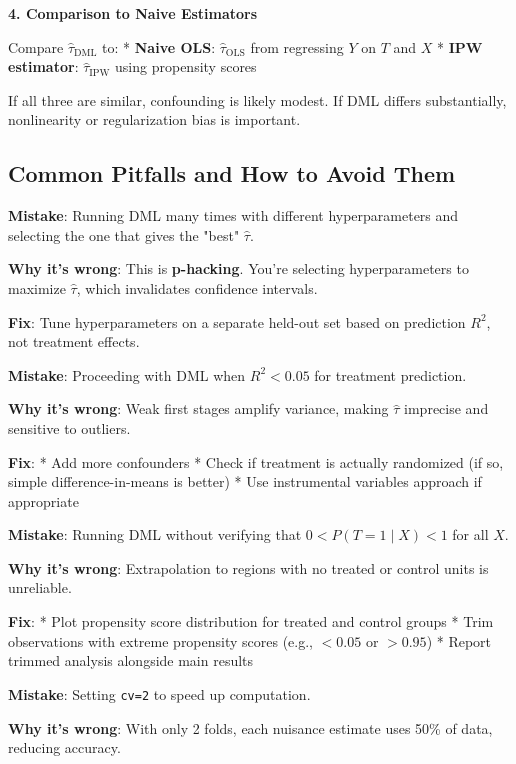 \textbf{4. Comparison to Naive Estimators}

Compare \(\hat{\tau}_{\text{DML}}\) to: * \textbf{Naive OLS}:
\(\hat{\tau}_{\text{OLS}}\) from regressing \(Y\) on \(T\) and \(X\) *
\textbf{IPW estimator}: \(\hat{\tau}_{\text{IPW}}\) using propensity
scores

If all three are similar, confounding is likely modest. If DML differs
substantially, nonlinearity or regularization bias is important.

\subsection{Common Pitfalls and How to Avoid
Them}\label{_common_pitfalls_and_how_to_avoid_them}

\textbf{Mistake}: Running DML many times with different hyperparameters
and selecting the one that gives the "best" \(\hat{\tau}\).

\textbf{Why it's wrong}: This is \textbf{p-hacking}. You're selecting
hyperparameters to maximize \(\hat{\tau}\), which invalidates confidence
intervals.

\textbf{Fix}: Tune hyperparameters on a separate held-out set based on
prediction \(R^2\), not treatment effects.

\textbf{Mistake}: Proceeding with DML when \(R^2 < 0.05\) for treatment
prediction.

\textbf{Why it's wrong}: Weak first stages amplify variance, making
\(\hat{\tau}\) imprecise and sensitive to outliers.

\textbf{Fix}: * Add more confounders * Check if treatment is actually
randomized (if so, simple difference-in-means is better) * Use
instrumental variables approach if appropriate

\textbf{Mistake}: Running DML without verifying that
\(0 < P(T=1 \mid X) < 1\) for all \(X\).

\textbf{Why it's wrong}: Extrapolation to regions with no treated or
control units is unreliable.

\textbf{Fix}: * Plot propensity score distribution for treated and
control groups * Trim observations with extreme propensity scores (e.g.,
\(< 0.05\) or \(> 0.95\)) * Report trimmed analysis alongside main
results

\textbf{Mistake}: Setting \texttt{cv=2} to speed up computation.

\textbf{Why it's wrong}: With only 2 folds, each nuisance estimate uses
50\% of data, reducing accuracy.

